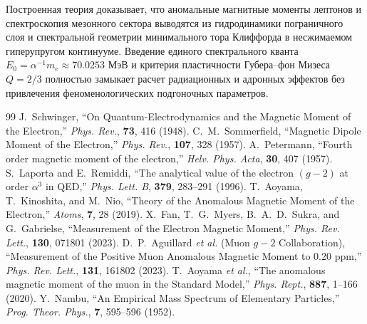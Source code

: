 \documentclass[12pt,a4paper]{article}
\begin{document}
	Построенная теория доказывает, что аномальные магнитные моменты лептонов и спектроскопия мезонного сектора выводятся из гидродинамики пограничного слоя и спектральной геометрии минимального тора Клиффорда в несжимаемом гиперупругом континууме. Введение единого спектрального кванта $E_0 = \alpha^{-1} m_e \approx 70.0253$ МэВ и критерия пластичности Губера--фон Мизеса $Q = 2/3$ полностью замыкает расчет радиационных и адронных эффектов без привлечения феноменологических подгоночных параметров.
	
	\begin{thebibliography}{99}
		 J.~Schwinger, ``On Quantum-Electrodynamics and the Magnetic Moment of the Electron,'' \textit{Phys. Rev.}, \textbf{73}, 416 (1948).
		 C.~M.~Sommerfield, ``Magnetic Dipole Moment of the Electron,'' \textit{Phys. Rev.}, \textbf{107}, 328 (1957).
		 A.~Petermann, ``Fourth order magnetic moment of the electron,'' \textit{Helv. Phys. Acta}, \textbf{30}, 407 (1957).
		 S.~Laporta and E.~Remiddi, ``The analytical value of the electron $(g-2)$ at order $\alpha^3$ in QED,'' \textit{Phys. Lett. B}, \textbf{379}, 283--291 (1996).
		 T.~Aoyama, T.~Kinoshita, and M.~Nio, ``Theory of the Anomalous Magnetic Moment of the Electron,'' \textit{Atoms}, \textbf{7}, 28 (2019).
		 X.~Fan, T.~G.~Myers, B.~A.~D.~Sukra, and G.~Gabrielse, ``Measurement of the Electron Magnetic Moment,'' \textit{Phys. Rev. Lett.}, \textbf{130}, 071801 (2023).
		 D.~P.~Aguillard \textit{et al.} (Muon $g-2$ Collaboration), ``Measurement of the Positive Muon Anomalous Magnetic Moment to 0.20 ppm,'' \textit{Phys. Rev. Lett.}, \textbf{131}, 161802 (2023).
		 T.~Aoyama \textit{et al.}, ``The anomalous magnetic moment of the muon in the Standard Model,'' \textit{Phys. Rept.}, \textbf{887}, 1--166 (2020).
		 Y.~Nambu, ``An Empirical Mass Spectrum of Elementary Particles,'' \textit{Prog. Theor. Phys.}, \textbf{7}, 595--596 (1952).
	\end{thebibliography}
	
\end{document}
